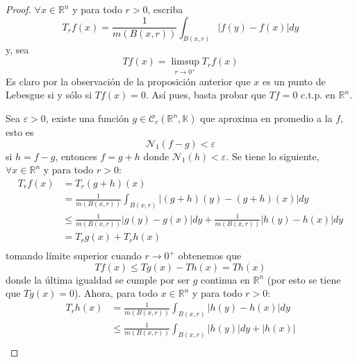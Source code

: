 \documentclass[12pt]{report}
\newcounter{it}
\theoremstyle{largebreak}
\renewcommand{\leq}{\ensuremath{\leqslant}}
\newcommand\abs[1]{\ensuremath{\left|#1\right|}}
\newcommand{\N}[2]{\ensuremath{\mathcal{N}_{#1}\left(#2\right)}}
\begin{document}
    \begin{proof}
        $\forall x\in\mathbb{R}^n$ y para todo $r>0$, escriba
        \begin{equation*}
            T_rf(x)=\frac{1}{m(B(x,r))}\int_{ B(x,r)}\abs{f(y)-f(x)}dy
        \end{equation*}
        y, sea
        \begin{equation*}
            Tf(x)=\limsup_{ r\rightarrow 0^+}T_rf(x)
        \end{equation*}
        Es claro por la observación de la proposición anterior que $x$ es un punto de Lebesgue si y sólo si $Tf(x)=0$. Así pues, basta probar que $Tf=0$ c.t.p. en $\mathbb{R}^n$.

        Sea $\varepsilon>0$, existe una función $g\in\mathcal{C}_c(\mathbb{R}^n,\mathbb{K})$ que aproxima en promedio a la $f$, esto es
        \begin{equation*}
            \N{1}{f-g}<\varepsilon
        \end{equation*}
        si $h=f-g$, entonces $f=g+h$ donde $\N{1}{h}<\varepsilon$. Se tiene lo siguiente, $\forall x\in\mathbb{R}^n$ y para todo $r>0$:
        \begin{equation*}
            \begin{split}
                T_rf(x)&=T_r(g+h)(x)\\
                &=\frac{1}{m(B(x,r))}\int_{B(x,r)}\abs{(g+h)(y)-(g+h)(x)}dy\\
                &\leq\frac{1}{m(B(x,r))}\abs{g(y)-g(x)}dy+\frac{1}{m(B(x,r))}\abs{h(y)-h(x)}dy\\
                &=T_rg(x)+T_rh(x)\\
            \end{split}
        \end{equation*}
        tomando límite superior cuando $r\rightarrow0^+$ obtenemos que
        \begin{equation*}
            Tf(x)\leq Tg(x)-Th(x)=Th(x)
        \end{equation*}
        donde la última igualdad se cumple por ser $g$ continua en $\mathbb{R}^n$ (por esto se tiene que $Tg(x)=0$). Ahora, para todo $x\in\mathbb{R}^n$ y para todo $r>0$:
        \begin{equation*}
            \begin{split}
                T_rh(x)&=\frac{1}{m(B(x,r))}\int_{B(x,r)}\abs{h(y)-h(x)}dy\\
                &\leq\frac{1}{m(B(x,r))}\int_{B(x,r)}\abs{h(y)}dy+\abs{h(x)}\\

\end{split}
\end{equation*}
\end{proof}
\end{document}
